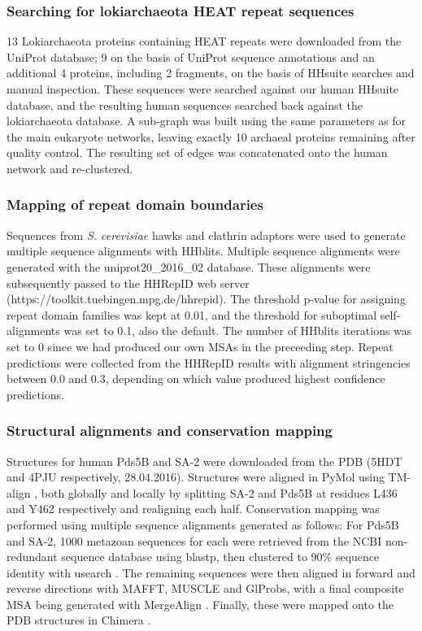 \documentclass[a4paper,11pt,twoside,openright]{scrbook}
\begin{document}
\subsubsection{Searching for lokiarchaeota HEAT repeat sequences}
13 Lokiarchaeota proteins containing HEAT repeats were downloaded from the UniProt database; 9 on the basis of UniProt sequence annotations and an additional 4 proteins, including 2 fragments, on the basis of HHsuite searches and manual inspection. These sequences were searched against our human HHsuite database, and the resulting human sequences searched back against the lokiarchaeota database. A sub-graph was built using the same parameters as for the main eukaryote networks, leaving exactly 10 archaeal proteins remaining after quality control. The resulting set of edges was concatenated onto the human network and re-clustered.

\subsubsection{Mapping of repeat domain boundaries}
Sequences from \textit{S. cerevisiae} hawks and clathrin adaptors were used to generate multiple sequence alignments with HHblits. Multiple sequence alignments were generated with the uniprot20\_2016\_02 database. These alignments were subsequently passed to the HHRepID web server \newline (https://toolkit.tuebingen.mpg.de/hhrepid). The threshold p-value for assigning repeat domain families was kept at 0.01, and the threshold for suboptimal self-alignments was set to 0.1, also the default. The number of HHblits iterations was set to 0 since we had produced our own MSAs in the preceeding step. Repeat predictions were collected from the HHRepID results with alignment stringencies between 0.0 and 0.3, depending on which value produced highest confidence predictions.

\subsubsection{Structural alignments and conservation mapping}
Structures for human Pds5B and SA-2 were downloaded from the PDB (5HDT \cite{Ouyang2016} and 4PJU \cite{Hara2014} respectively, 28.04.2016). Structures were aligned in PyMol using TM-align \cite{PyMol2016,Zhang2005}, both globally and locally by splitting SA-2 and Pds5B at residues L436 and Y462 respectively and realigning each half. Conservation mapping was performed using multiple sequence alignments generated as follows: For Pds5B and SA-2, 1000 metazoan sequences for each were retrieved from the NCBI non-redundant sequence database using blastp, then clustered to 90\% sequence identity with usearch \cite{Altschul1990,Edgar2010}. The remaining sequences were then aligned in forward and reverse directions with MAFFT, MUSCLE and GlProbs, with a final composite MSA being generated with MergeAlign \cite{Katoh2002,Edgar2004,Ye2015,Collingridge2012}. Finally, these were mapped onto the PDB structures in Chimera \cite{Pettersen2004}.
\end{document}
